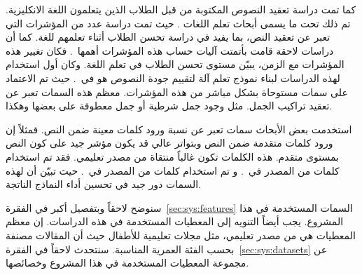 كما تمت دراسة تعقيد النصوص المكتوبة من قبل الطلاب الذين يتعلمون اللغة الانكليزية.
تم ذلك تحت ما يسمى أبحاث تعلم اللغات .
حيث تمت دراسة عدد من المؤشرات التي تعبر عن تعقيد النص، بما يفيد في دراسة تحسن الطلاب أثناء تعلمهم للغة.
كما أن دراسات لاحقة قامت بأتمتت آليات حساب هذه المؤشرات أهمها~\cite{lu2010}.
فكان تغيير هذه المؤشرات مع الزمن، يبيّن مستوى تحسن الطلاب في تعلم اللغة.
وكان أول استخدام لهذه الدراسات لبناء نموذج تعلم آلة لتقييم جودة النصوص هو في~\cite{vajjala2012}.
حيث تم الاعتماد على سمات مستوحاة بشكل مباشر من هذه المؤشرات.
معظم هذه السمات تعبر عن تعقيد تراكيب الجمل.
مثل وجود جمل شرطية أو جمل معطوفة على بعضها وهكذا.

استخدمت بعض الأبحاث سمات تعبر عن نسبة ورود كلمات معينة ضمن النص.
فمثلاً إن ورود كلمات متقدمة ضمن النص وبتواتر عالي قد يكون مؤشر جيد على كون النص بمستوى متقدم.
هذه الكلمات تكون غالباً منتقاة من مصدر تعليمي.
فقد تم استخدام كلمات من المصدر
في~\cite{vajjala2012,vajjala2014,vajjala2018}.
و تم استخدام كلمات من المصدر
في~\cite{xia2016}.
حيث تبيّن أن لهذه السمات دور جيد في تحسين أداء النماذج الناتجة.

سنوضح لاحقاً  وبتفصيل أكبر في الفقرة~\ref{sec:sys:features} السمات المستخدمة في هذا المشروع.
يجب أيضاً التنويه إلى المعطيات المستخدمة في هذه الدراسات.
إن معظم المعطيات هي من مصدر تعليمي،
مثل مجلات تعليمية للأطفال حيث أن المقالات مصنفة بحسب الفئة العمرية المناسبة.
سنتحدث لاحقاً في الفقرة~\ref{sec:sys:datasets} عن مجموعة المعطيات المستخدمة في هذا المشروع وخصائصها.



